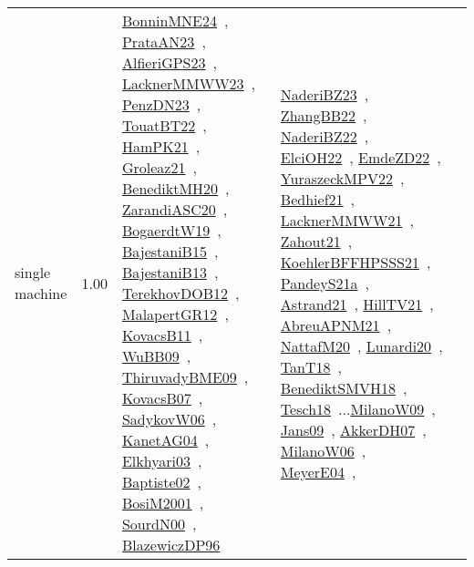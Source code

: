 {\begin{longtable}{p{3cm}r>{\raggedright\arraybackslash}p{6cm}>{\raggedright\arraybackslash}p{6cm}>{\raggedright\arraybackslash}p{8cm}}
\index{single machine}\index{Classification!single machine}single machine &  1.00 & \href{../works/BonninMNE24.pdf}{BonninMNE24}~\cite{BonninMNE24}, \href{../works/PrataAN23.pdf}{PrataAN23}~\cite{PrataAN23}, \href{../works/AlfieriGPS23.pdf}{AlfieriGPS23}~\cite{AlfieriGPS23}, \href{../works/LacknerMMWW23.pdf}{LacknerMMWW23}~\cite{LacknerMMWW23}, \href{../works/PenzDN23.pdf}{PenzDN23}~\cite{PenzDN23}, \href{../works/TouatBT22.pdf}{TouatBT22}~\cite{TouatBT22}, \href{../works/HamPK21.pdf}{HamPK21}~\cite{HamPK21}, \href{../works/Groleaz21.pdf}{Groleaz21}~\cite{Groleaz21}, \href{../works/BenediktMH20.pdf}{BenediktMH20}~\cite{BenediktMH20}, \href{../works/ZarandiASC20.pdf}{ZarandiASC20}~\cite{ZarandiASC20}, \href{../works/BogaerdtW19.pdf}{BogaerdtW19}~\cite{BogaerdtW19}, \href{../works/BajestaniB15.pdf}{BajestaniB15}~\cite{BajestaniB15}, \href{../works/BajestaniB13.pdf}{BajestaniB13}~\cite{BajestaniB13}, \href{../works/TerekhovDOB12.pdf}{TerekhovDOB12}~\cite{TerekhovDOB12}, \href{../works/MalapertGR12.pdf}{MalapertGR12}~\cite{MalapertGR12}, \href{../works/KovacsB11.pdf}{KovacsB11}~\cite{KovacsB11}, \href{../works/WuBB09.pdf}{WuBB09}~\cite{WuBB09}, \href{../works/ThiruvadyBME09.pdf}{ThiruvadyBME09}~\cite{ThiruvadyBME09}, \href{../works/KovacsB07.pdf}{KovacsB07}~\cite{KovacsB07}, \href{../works/SadykovW06.pdf}{SadykovW06}~\cite{SadykovW06}, \href{../works/KanetAG04.pdf}{KanetAG04}~\cite{KanetAG04}, \href{../works/Elkhyari03.pdf}{Elkhyari03}~\cite{Elkhyari03}, \href{../works/Baptiste02.pdf}{Baptiste02}~\cite{Baptiste02}, \href{../works/BosiM2001.pdf}{BosiM2001}~\cite{BosiM2001}, \href{../works/SourdN00.pdf}{SourdN00}~\cite{SourdN00}, \href{../works/BlazewiczDP96.pdf}{BlazewiczDP96}~\cite{BlazewiczDP96} & \href{../works/NaderiBZ23.pdf}{NaderiBZ23}~\cite{NaderiBZ23}, \href{../works/ZhangBB22.pdf}{ZhangBB22}~\cite{ZhangBB22}, \href{../works/NaderiBZ22.pdf}{NaderiBZ22}~\cite{NaderiBZ22}, \href{../works/ElciOH22.pdf}{ElciOH22}~\cite{ElciOH22}, \href{../works/EmdeZD22.pdf}{EmdeZD22}~\cite{EmdeZD22}, \href{../works/YuraszeckMPV22.pdf}{YuraszeckMPV22}~\cite{YuraszeckMPV22}, \href{../works/Bedhief21.pdf}{Bedhief21}~\cite{Bedhief21}, \href{../works/LacknerMMWW21.pdf}{LacknerMMWW21}~\cite{LacknerMMWW21}, \href{../works/Zahout21.pdf}{Zahout21}~\cite{Zahout21}, \href{../works/KoehlerBFFHPSSS21.pdf}{KoehlerBFFHPSSS21}~\cite{KoehlerBFFHPSSS21}, \href{../works/PandeyS21a.pdf}{PandeyS21a}~\cite{PandeyS21a}, \href{../works/Astrand21.pdf}{Astrand21}~\cite{Astrand21}, \href{../works/HillTV21.pdf}{HillTV21}~\cite{HillTV21}, \href{../works/AbreuAPNM21.pdf}{AbreuAPNM21}~\cite{AbreuAPNM21}, \href{../works/NattafM20.pdf}{NattafM20}~\cite{NattafM20}, \href{../works/Lunardi20.pdf}{Lunardi20}~\cite{Lunardi20}, \href{../works/TanT18.pdf}{TanT18}~\cite{TanT18}, \href{../works/BenediktSMVH18.pdf}{BenediktSMVH18}~\cite{BenediktSMVH18}, \href{../works/Tesch18.pdf}{Tesch18}~\cite{Tesch18}...\href{../works/MilanoW09.pdf}{MilanoW09}~\cite{MilanoW09}, \href{../works/Jans09.pdf}{Jans09}~\cite{Jans09}, \href{../works/AkkerDH07.pdf}{AkkerDH07}~\cite{AkkerDH07}, \href{../works/MilanoW06.pdf}{MilanoW06}~\cite{MilanoW06}, \href{../works/MeyerE04.pdf}{MeyerE04}~\cite{MeyerE04}, 
\end{longtable}}
